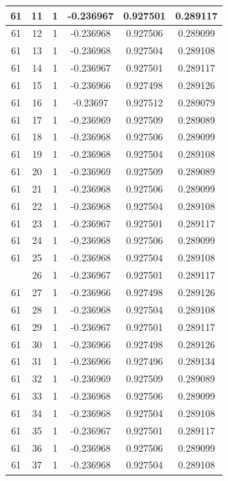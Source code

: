 \documentclass[12pt,a4paper]{article}
\numberwithin{equation}{section}
\numberwithin{figure}{section}
\numberwithin{table}{section}
\begin{document}
\begin{longtable}{|c|c|c|c|c|c|}
61 & 11 & 1 & -0.236967 & 0.927501 & 0.289117 \\ \hline
61 & 12 & 1 & -0.236968 & 0.927506 & 0.289099 \\ \hline
61 & 13 & 1 & -0.236968 & 0.927504 & 0.289108 \\ \hline
61 & 14 & 1 & -0.236967 & 0.927501 & 0.289117 \\ \hline
61 & 15 & 1 & -0.236966 & 0.927498 & 0.289126 \\ \hline
61 & 16 & 1 & -0.23697 & 0.927512 & 0.289079 \\ \hline
61 & 17 & 1 & -0.236969 & 0.927509 & 0.289089 \\ \hline
61 & 18 & 1 & -0.236968 & 0.927506 & 0.289099 \\ \hline
61 & 19 & 1 & -0.236968 & 0.927504 & 0.289108 \\ \hline
61 & 20 & 1 & -0.236969 & 0.927509 & 0.289089 \\ \hline
61 & 21 & 1 & -0.236968 & 0.927506 & 0.289099 \\ \hline
61 & 22 & 1 & -0.236968 & 0.927504 & 0.289108 \\ \hline
61 & 23 & 1 & -0.236967 & 0.927501 & 0.289117 \\ \hline
61 & 24 & 1 & -0.236968 & 0.927506 & 0.289099 \\ \hline
61 & 25 & 1 & -0.236968 & 0.927504 & 0.289108 \\ \hline
\pagebreak
61 & 26 & 1 & -0.236967 & 0.927501 & 0.289117 \\ \hline
61 & 27 & 1 & -0.236966 & 0.927498 & 0.289126 \\ \hline
61 & 28 & 1 & -0.236968 & 0.927504 & 0.289108 \\ \hline
61 & 29 & 1 & -0.236967 & 0.927501 & 0.289117 \\ \hline
61 & 30 & 1 & -0.236966 & 0.927498 & 0.289126 \\ \hline
61 & 31 & 1 & -0.236966 & 0.927496 & 0.289134 \\ \hline
61 & 32 & 1 & -0.236969 & 0.927509 & 0.289089 \\ \hline
61 & 33 & 1 & -0.236968 & 0.927506 & 0.289099 \\ \hline
61 & 34 & 1 & -0.236968 & 0.927504 & 0.289108 \\ \hline
61 & 35 & 1 & -0.236967 & 0.927501 & 0.289117 \\ \hline
61 & 36 & 1 & -0.236968 & 0.927506 & 0.289099 \\ \hline
61 & 37 & 1 & -0.236968 & 0.927504 & 0.289108 \\ \hline

\end{longtable}
\end{document}
